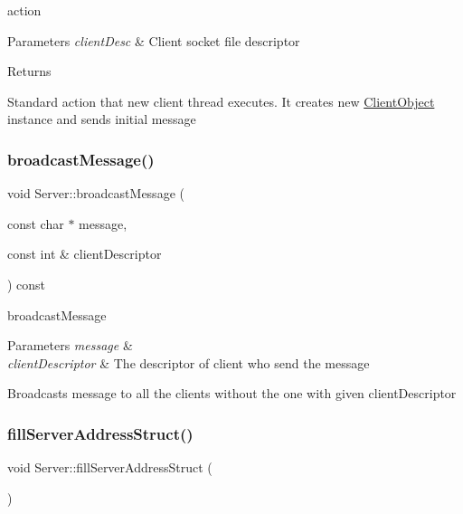 action 


\begin{DoxyParams}{Parameters}
{\em client\+Desc} & Client socket file descriptor \\
\hline
\end{DoxyParams}
\begin{DoxyReturn}{Returns}

\end{DoxyReturn}
Standard action that new client thread executes. It creates new \hyperlink{classClientObject}{Client\+Object} instance and sends initial message \mbox{\label{classServer_a7153ea97c1112ae9dc61c65dc59c7f82}} 
\subsubsection{\texorpdfstring{broadcast\+Message()}{broadcastMessage()}}
{\footnotesize\ttfamily void Server\+::broadcast\+Message (\begin{DoxyParamCaption}\item[{const char $\ast$}]{message,  }\item[{const int \&}]{client\+Descriptor }\end{DoxyParamCaption}) const\hspace{0.3cm}{\ttfamily [private]}}



broadcast\+Message 


\begin{DoxyParams}{Parameters}
{\em message} & \\
\hline
{\em client\+Descriptor} & The descriptor of client who send the message\\
\hline
\end{DoxyParams}
Broadcasts message to all the clients without the one with given client\+Descriptor \mbox{\label{classServer_a684bf0fce1ec62711a60d0cc3d25e8f8}} 
\subsubsection{\texorpdfstring{fill\+Server\+Address\+Struct()}{fillServerAddressStruct()}}
{\footnotesize\ttfamily void Server\+::fill\+Server\+Address\+Struct (\begin{DoxyParamCaption}{ }\end{DoxyParamCaption})\hspace{0.3cm}{\ttfamily [private]}}



